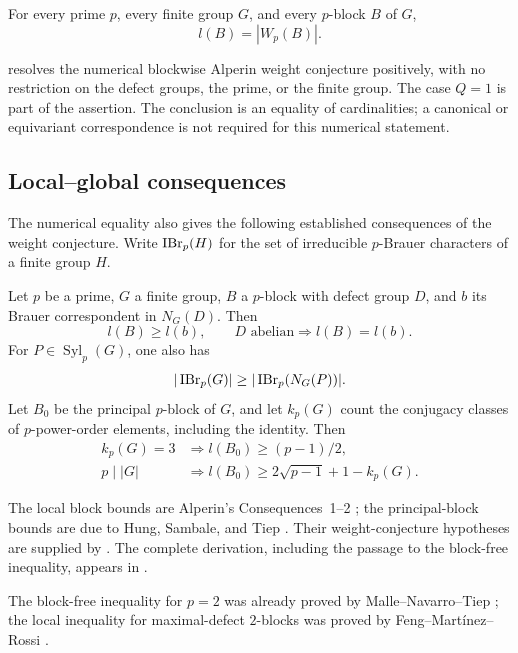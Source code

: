 \begin{theorem}\label{thm:main}
For every prime $p$, every finite group $G$, and every $p$-block $B$ of $G$,
\[
                  l(B)=|W_p(B)|.
\]
\end{theorem}

 resolves the numerical blockwise Alperin weight conjecture
positively, with no restriction on the defect groups, the prime, or the
finite group. The case $Q=1$ is part of the assertion. The conclusion is
an equality of cardinalities; a canonical or equivariant correspondence
is not required for this numerical statement.

\subsection*{Local--global consequences}

The numerical equality also gives the following established consequences
of the weight conjecture. Write $\operatorname{IBr}_p(H)$ for the set of irreducible
$p$-Brauer characters of a finite group $H$.

\begin{corollary}\label{cor:block-consequences}
Let $p$ be a prime, $G$ a finite group, $B$ a $p$-block with defect group
$D$, and $b$ its Brauer correspondent in $N_G(D)$. Then
\[
 l(B)\geq l(b),\qquad
 D\text{ abelian}\Longrightarrow l(B)=l(b).
\]
For $P\in\operatorname{Syl}_p(G)$, one also has
\[
 |\operatorname{IBr}_p(G)|\geq|\operatorname{IBr}_p(N_G(P))|.
\]
Let $B_0$ be the principal $p$-block of $G$, and let $k_p(G)$ count the
conjugacy classes of $p$-power-order elements, including the identity.
Then
\[
 \begin{aligned}
 k_p(G)=3&\Longrightarrow l(B_0)\geq (p-1)/2,\\
 p\mid |G|&\Longrightarrow l(B_0)\geq 2\sqrt{p-1}+1-k_p(G).
 \end{aligned}
\]
\end{corollary}

The local block bounds are Alperin's Consequences~1--2
\cite{Alperin1987}; the principal-block bounds are due to Hung,
Sambale, and Tiep \cite[Propositions~3.1--3.2]{HST2024}.
Their weight-conjecture hypotheses are supplied by .
The complete derivation, including the passage to the block-free
inequality, appears in .

The block-free inequality for $p=2$ was already proved by
Malle--Navarro--Tiep \cite[Theorem~B]{MNT2023}; the local inequality for
maximal-defect $2$-blocks was proved by Feng--Mart\'inez--Rossi
\cite[Theorem~D]{FMR2025}.

